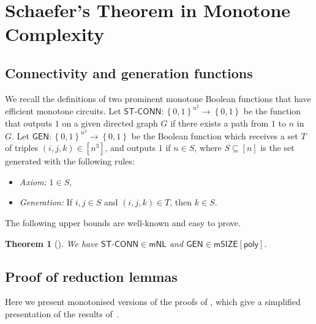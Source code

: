 \documentclass[10pt,a4paper]{article}
\newtheorem{theorem}{Theorem}[section]
\newcommand{\poly}{\mathsf{poly}}
\newcommand{\complexityfont}[1]{\mathsf{#1}}
\newcommand{\monclass}[1]{\mathsf{m}#1}
\newcommand\NL           {\complexityfont{NL}}
\def\mNL          {\monclass{\NL}}
\def\SIZE         {\complexityfont{SIZE}}
\def\mSIZE        {\monclass{\SIZE}}
\def\sseq{\subseteq}
\newcommand{\set}[1]{\left\{#1\right\}}
\newcommand{\blt}{\set{0,1}}
\newcommand{\stconn}{\mathsf{ST\text{-}CONN}}
\newcommand{\GEN}{\mathsf{GEN}}
\begin{document}
\section{Schaefer's Theorem in Monotone Complexity}
\label{sec:schaefer_proof}

\subsection{Connectivity and generation functions}

We recall the definitions of two prominent monotone Boolean functions
that have efficient monotone circuits.
Let $\stconn : \blt^{n^2} \to \blt$
be the function that outputs $1$ on a given directed graph $G$
if there exists a path from $1$ to $n$ in $G$.
Let $\GEN : \blt^{n^3} \to \blt$
be the Boolean function which receives a set $T$ of triples 
$(i,j,k) \in [n^3]$,
and outputs $1$ if 
$n \in S$, where $S \sseq [n]$ is the 
set generated with the following rules:

\begin{itemize}
    \item \emph{Axiom:} $1 \in S$,
    \item \emph{Generation:} If $i,j \in S$ and $(i,j,k) \in T$, then
        $k \in S$.
\end{itemize}

The following upper bounds are well-known and easy to prove.

\begin{theorem}
    []
    \label{thm:stconn-gen}
    We have $\stconn \in \mNL$ and
    $\GEN \in \mSIZE[\poly]$.
\end{theorem}

\subsection{Proof of reduction lemmas}
\label{sec:reduction_monotone}

Here we present monotonised versions of the proofs of
\cite[Propositions 2.2 - 2.4]{playing_two},
which give a simplified presentation of the results
of~\cite{DBLP:conf/stoc/Schaefer78}.


\inclcoq*
\end{document}
